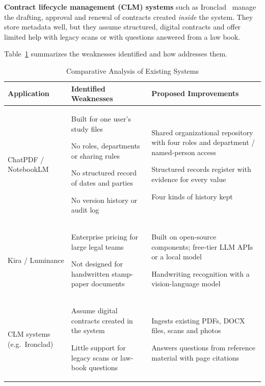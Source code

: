 \textbf{Contract lifecycle management (CLM) systems} such as Ironclad~\cite{ironclad} manage the
drafting, approval and renewal of contracts created \emph{inside} the system. They store metadata
well, but they assume structured, digital contracts and offer limited help with legacy scans or with
questions answered from a law book.

Table~\ref{tab:related} summarizes the weaknesses identified and how \sysname{} addresses them.

\begin{table}[H]\centering
\caption{Comparative Analysis of Existing Systems}\label{tab:related}
\begin{tabularx}{\textwidth}{|p{3cm}|X|X|}\hline
\textbf{Application} & \textbf{Identified Weaknesses} & \textbf{Proposed Improvements} \\ \hline
ChatPDF / NotebookLM &
\begin{bullets}
\item Built for one user's study files
\item No roles, departments or sharing rules
\item No structured record of dates and parties
\item No version history or audit log
\end{bullets} &
\begin{bullets}
\item Shared organizational repository with four roles and department / named-person access
\item Structured records register with evidence for every value
\item Four kinds of history kept
\end{bullets} \\ \hline
Kira / Luminance &
\begin{bullets}
\item Enterprise pricing for large legal teams
\item Not designed for handwritten stamp-paper documents
\end{bullets} &
\begin{bullets}
\item Built on open-source components; free-tier LLM APIs or a local model
\item Handwriting recognition with a vision-language model
\end{bullets} \\ \hline
CLM systems (e.g.\ Ironclad) &
\begin{bullets}
\item Assume digital contracts created in the system
\item Little support for legacy scans or law-book questions
\end{bullets} &
\begin{bullets}
\item Ingests existing PDFs, DOCX files, scans and photos
\item Answers questions from reference material with page citations
\end{bullets} \\ \hline
\end{tabularx}
\end{table}


